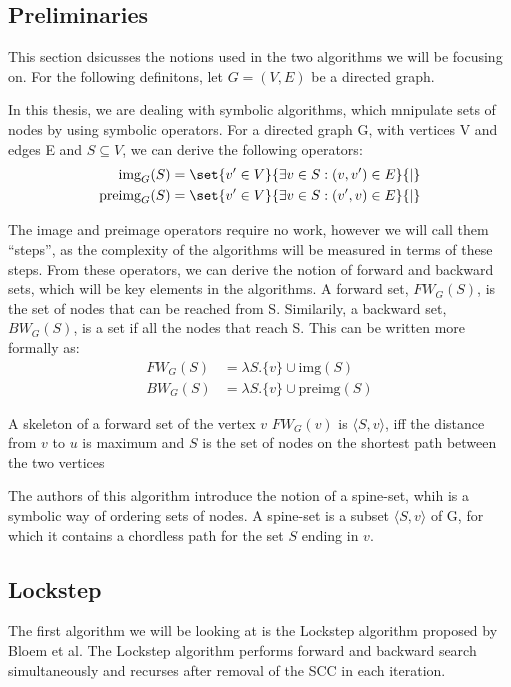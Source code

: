 \documentclass[../master/master.tex]{subfiles}
\newcommand{\FW}[2][G]{\ensuremath{FW_{#1}(#2)}}
\newcommand{\BW}[2][G]{\ensuremath{BW_{#1}(#2)}}
\newcommand{\pair}[2]{\ensuremath{\langle #1, #2\rangle}}
\newcommand{\img}[2][G]{\ensuremath{\text{img}_{#1}(#2)}}
\newcommand{\pre}[2][G]{\ensuremath{\text{preimg}_{#1}(#2)}}
\begin{document}
\subsection{Preliminaries}

This section dsicusses the notions used in the two algorithms we will be focusing on. For the following definitons, let $G=(V,E)$ be a directed graph.

In this thesis, we are dealing with symbolic algorithms, which mnipulate sets of nodes by using symbolic operators. For a directed graph G, with vertices V and edges E and $S\subseteq V$, we can derive the following operators:
\begin{align*}
\img S &= \set{v' \in V}{\exists v\in S:(v, v')\in E}{|}\\
\pre S &= \set{v' \in V}{\exists v\in S:(v', v)\in E}{|}
\end{align*}

The image and preimage operators require no work, however we will call them ``steps'', as the complexity of the algorithms will be measured in terms of these steps.
From these operators, we can derive the notion of forward and backward sets, which will be key elements in the algorithms. A forward set, \FW{S}, is the set of nodes that can be reached from S. Similarily, a backward set, \BW{S}, is a set if all the nodes that reach S. This can be written more formally as:
\begin{align*}
\FW{S} &= \lambda S.\{v\}\cup \text{img}(S)\\
\BW{S} &= \lambda S.\{v\}\cup \text{preimg}(S)
\end{align*}

A skeleton of a forward set of the vertex $v$ \FW{v} is \pair{S}{v}, iff the distance from $v$ to $u$ is maximum and $S$ is the set of nodes on the shortest path between the two vertices

The authors of this algorithm introduce the notion of a spine-set, whih is a symbolic way of ordering sets of nodes. A spine-set is a subset \pair{S}{v} of G, for which it contains a chordless path for the set $S$ ending in $v$.

\subsection{Lockstep}
The first algorithm we will be looking at is the Lockstep algorithm proposed by Bloem et al. \cite{lockstep} The Lockstep algorithm performs forward and backward search simultaneously and recurses after removal of the SCC in each iteration.
\end{document}
